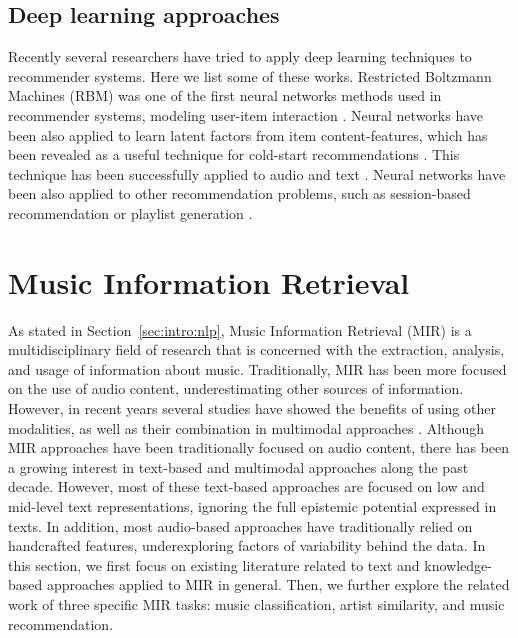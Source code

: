 \subsection{Deep learning approaches}

Recently several researchers have tried to apply deep learning techniques to recommender systems. Here we list some of these works. 
Restricted Boltzmann Machines (RBM) was one of the first neural networks methods used in recommender systems, modeling user-item interaction \citep{salakhutdinov2007restricted}. Neural networks have been also applied to learn latent factors from item content-features, which has been revealed as a useful technique for cold-start recommendations \citep{wang2015collaborative}. This technique has been successfully applied to audio \citep{Oord2013} and text \citep{bansal2016ask}. Neural networks have been also applied to other recommendation problems, such as session-based recommendation \citep{hidasi2015session} or playlist generation \citep{vall2017music}.


\section{Music Information Retrieval}
\label{sec:SOA:mir}

As stated in Section~\ref{sec:intro:nlp}, Music Information Retrieval (MIR) is a multidisciplinary field of research that is concerned with the extraction, analysis, and usage of information about music. Traditionally, MIR has been more focused on the use of audio content, underestimating other sources of information. However, in recent years several studies have showed the benefits of using other modalities, as well as their combination in multimodal approaches \citep{Schedl2014}.
Although MIR approaches have been traditionally focused on audio content, there has been a growing interest in text-based and multimodal approaches along the past decade. However, most of these text-based approaches are focused on low and mid-level text representations, ignoring the full epistemic potential expressed in texts. In addition, most audio-based approaches have traditionally relied on handcrafted features, underexploring factors of variability behind the data.
In this section, we first focus on existing literature related to text and knowledge-based approaches applied to MIR in general. Then, we further explore the related work of three specific MIR tasks: music classification, artist similarity, and music recommendation.

